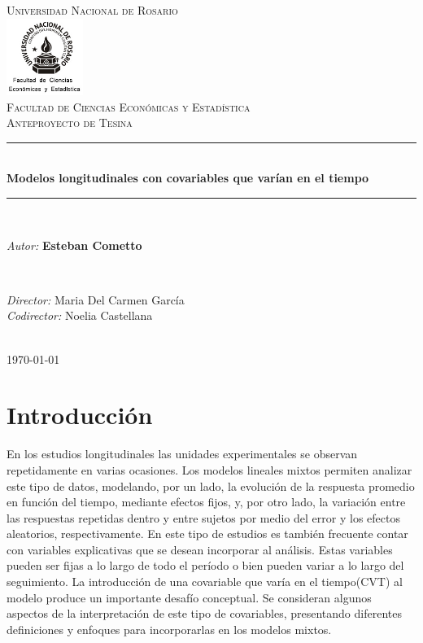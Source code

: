 \documentclass[12pt]{article}
\title{\thesistitle}
\author{\thesisauthorfirst\space\thesisauthorsecond}
\date{\thesisdate}
\def\thesistitle{Modelos longitudinales con covariables que varían en el tiempo}
\def\thesisauthorfirst{\textbf{Esteban Cometto}}
\def\thesissupervisorfirst{Maria Del Carmen García}
\def\thesissupervisorsecond{Noelia Castellana}
\def\thesisdate{\today}
\def\cvt{covariable que varía en el tiempo}
\begin{document}
\begin{titlepage}
    \newcommand{\HRule}{\rule{\linewidth}{0.5mm}}
	\center
	\textsc{\Large Universidad Nacional de Rosario}\\[.7cm]
	\includegraphics[width=25mm]{img/fceye-unr.png}\\[.5cm]
	\textsc{Facultad de Ciencias Económicas y Estadística}\\[0.5cm]
	\textsc{Anteproyecto de Tesina}
	
	\HRule \\[0.4cm]
	{ \huge \bfseries \thesistitle}\\[0.1cm]
	\HRule \\[.5cm]
	
	\begin{minipage}{0.6\textwidth}
	\large
	\emph{Autor:}	\thesisauthorfirst
	\end{minipage}
	\\[.6cm]
	\begin{minipage}{0.6\textwidth}
	\emph{Director:} 	\thesissupervisorfirst \\[.2cm]
	\emph{Codirector:} 	\thesissupervisorsecond
	\end{minipage}
	\\[4cm]
	\vfill
	{\large \thesisdate}\\
	\clearpage
\end{titlepage}

\newpage
\tableofcontents

\newpage
\section{Introducción}

En los estudios longitudinales las unidades experimentales se observan repetidamente en varias ocasiones. Los modelos 
lineales mixtos permiten analizar este tipo de datos, modelando, por un lado, la evolución de la respuesta promedio en 
función del tiempo, mediante efectos fijos, y, por otro lado, la variación entre las respuestas repetidas dentro y entre 
sujetos por medio del error y los efectos aleatorios, respectivamente. En este tipo de estudios es también frecuente contar 
con variables explicativas que se desean incorporar al análisis. Estas variables pueden ser fijas a lo largo de todo el 
período o bien pueden variar a lo largo del seguimiento. La introducción de una \cvt (CVT) al 
modelo produce un importante desafío conceptual. Se consideran algunos aspectos de la interpretación de este tipo de 
covariables, presentando diferentes definiciones y enfoques para incorporarlas en los modelos mixtos.
\end{document}
